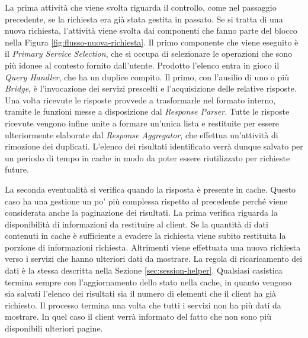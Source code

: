 La prima attività che viene svolta riguarda il controllo, come nel passaggio precedente, se la richiesta era già stata gestita in passato. Se si tratta di una nuova richiesta, l'attività viene svolta dai componenti che fanno parte del blocco  nella Figura \ref{fig:flusso-nuova-richiesta}. Il primo componente che viene eseguito è il \emph{Primary Service Selection}, che si occupa di selezionare le operazioni che sono più idonee al contesto fornito dall'utente. Prodotto l'elenco entra in gioco il \emph{Query Handler}, che ha un duplice compito. Il primo, con l'ausilio di uno o più \emph{Bridge}, è l'invocazione dei servizi prescelti e l'acquisizione delle relative risposte. Una volta ricevute le risposte provvede a trasformarle nel formato interno, tramite le funzioni messe a disposizione dal \emph{Response Parser}. Tutte le risposte ricevute vengono infine unite a formare un'unica lista e restituite per essere ulteriormente elaborate dal \emph{Response Aggregator}, che effettua un'attività di rimozione dei duplicati. L'elenco dei risultati identificato verrà dunque salvato per un periodo di tempo in cache in modo da poter essere riutilizzato per richieste future.

La seconda eventualità si verifica quando la risposta è presente in cache. Questo caso ha una gestione un po' più complessa rispetto al precedente perché viene considerata anche la paginazione dei risultati. La prima verifica riguarda la disponibilità di informazioni da restituire al client. Se la quantità di dati contenuti in cache è sufficiente a evadere la richiesta viene subito restituita la porzione di informazioni richiesta. Altrimenti viene effettuata una nuova richiesta verso i servizi che hanno ulteriori dati da mostrare. La regola di ricaricamento dei dati è la stessa descritta nella Sezione \ref{sec:session-helper}. Qualsiasi casistica termina sempre con l'aggiornamento dello stato nella cache, in quanto vengono sia salvati l'elenco dei risultati sia il numero di elementi che il client ha già richiesto. Il processo termina una volta che tutti i servizi non ha più dati da mostrare. In quel caso il client verrà informato del fatto che non sono più disponibili ulteriori pagine.


